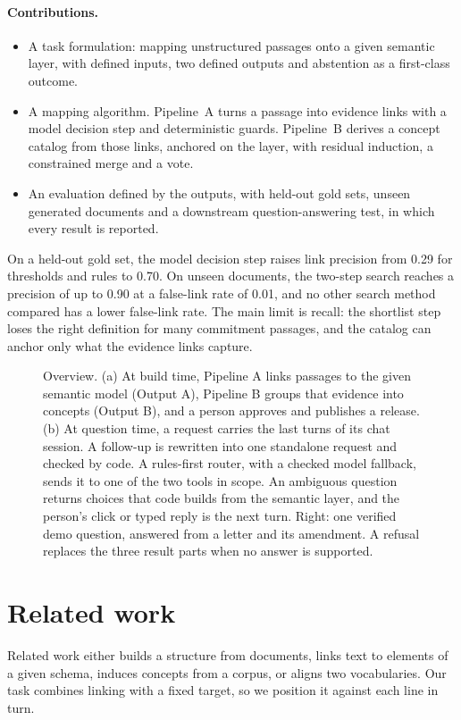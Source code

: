 \documentclass[11pt,a4paper]{article}
\begin{document}
\paragraph{Contributions.}
\begin{itemize}[nosep]
\item A task formulation: mapping unstructured passages onto a given semantic layer, with defined inputs, two defined outputs and abstention as a first-class outcome.
\item A mapping algorithm. Pipeline~A turns a passage into evidence links with a model decision step and deterministic guards. Pipeline~B derives a concept catalog from those links, anchored on the layer, with residual induction, a constrained merge and a vote.
\item An evaluation defined by the outputs, with held-out gold sets, unseen generated documents and a downstream question-answering test, in which every result is reported.
\end{itemize}

On a held-out gold set, the model decision step raises link precision from 0.29 for thresholds and rules to 0.70. On unseen documents, the two-step search reaches a precision of up to 0.90 at a false-link rate of 0.01, and no other search method compared has a lower false-link rate. The main limit is recall: the shortlist step loses the right definition for many commitment passages, and the catalog can anchor only what the evidence links capture.

\begin{figure}[tb]
\centering
\resizebox{\textwidth}{!}{}
\caption{Overview. (a) At build time, Pipeline A links passages to the given semantic model (Output A), Pipeline B groups that evidence into concepts (Output B), and a person approves and publishes a release. (b) At question time, a request carries the last turns of its chat session. A follow-up is rewritten into one standalone request and checked by code. A rules-first router, with a checked model fallback, sends it to one of the two tools in scope. An ambiguous question returns choices that code builds from the semantic layer, and the person's click or typed reply is the next turn. Right: one verified demo question, answered from a letter and its amendment. A refusal replaces the three result parts when no answer is supported.}
\label{fig:overview}
\end{figure}

\section{Related work}\label{sec:related}
Related work either builds a structure from documents, links text to elements of a given schema, induces concepts from a corpus, or aligns two vocabularies. Our task combines linking with a fixed target, so we position it against each line in turn.
\end{document}
